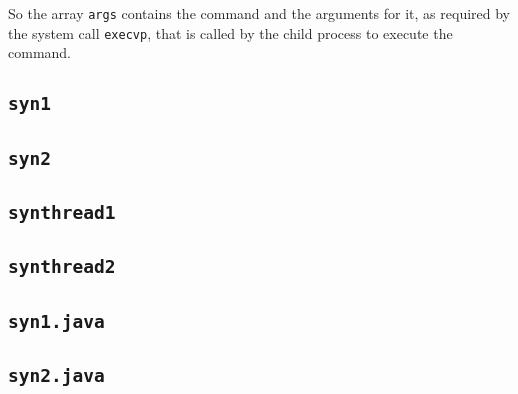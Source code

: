 So the array \texttt{args} contains the command and the arguments for it, as required by the system call \texttt{execvp}, that is called by the child process to execute the command.

\subsection{\texttt{syn1}}
\subsection{\texttt{syn2}}
\subsection{\texttt{synthread1}}
\subsection{\texttt{synthread2}}
\subsection{\texttt{syn1.java}}
\subsection{\texttt{syn2.java}}


\clearpage



